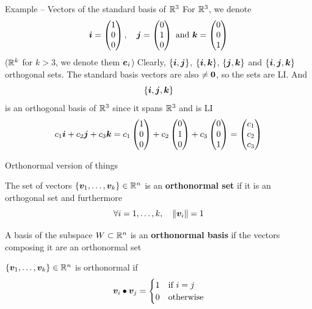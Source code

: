 \documentclass[aspectratio=169]{beamer}\usepackage[]{graphicx}\usepackage[]{xcolor}
\begin{document}
\begin{frame}{Example -- Vectors of the standard basis of $\mathbb{R}^3$}
For $\mathbb{R}^3$, we denote
\[
\bm{i} =\begin{pmatrix}
1\\0\\0
\end{pmatrix},\quad
\bm{j} =\begin{pmatrix}
0\\1\\0
\end{pmatrix}
\textrm{ and }
\bm{k} =\begin{pmatrix}
0\\0\\1
\end{pmatrix}
\]
($\mathbb{R}^k$ for $k>3$, we denote them $\bm{e}_i$)
\vfill
Clearly, $\{\bm{i},\bm{j}\}$, $\{\bm{i},\bm{k}\}$, $\{\bm{j},\bm{k}\}$ and $\{\bm{i},\bm{j},\bm{k}\}$ orthogonal sets. The standard basis vectors are also $\neq\b0$, so the sets are LI. And
\[
\{\bm{i},\bm{j},\bm{k}\}
\]
is an orthogonal basis of $\mathbb{R}^3$ since it spans $\mathbb{R}^3$ and is LI
\vfill
\[
c_1\bm{i}+c_2\bm{j}+c_3\bm{k}
=
c_1\begin{pmatrix}
1\\0\\0
\end{pmatrix}
+c_2\begin{pmatrix}
0\\1\\0
\end{pmatrix}
+c_3\begin{pmatrix}
0\\0\\1
\end{pmatrix}
=
\begin{pmatrix}
c_1\\c_2\\c_3
\end{pmatrix}
\]
\end{frame}

\begin{frame}{Orthonormal version of things}
\begin{importantdefinition}
The set of vectors $\{\bm{v}_1,\ldots,\bm{v}_k\}\in\mathbb{R}^n$ is an \textbf{orthonormal set} if it is an orthogonal set and furthermore
\[
\forall i=1,\ldots,k,\quad \|\bm{v}_i\|=1
\]
\end{importantdefinition}
\begin{importantdefinition}
A basis of the subspace $W\subset\mathbb{R}^n$ is an \textbf{orthonormal basis} if the vectors composing it are an orthonormal set
\end{importantdefinition}
\vfill
$\{\bm{v}_1,\ldots,\bm{v}_k\}\in\mathbb{R}^n$ is orthonormal if
\[
\bm{v}_i\bullet\bm{v}_j =
\begin{cases}
1 &\textrm{if }i=j \\
0 &\textrm{otherwise}
\end{cases}
\]
\end{frame}
\end{document}
